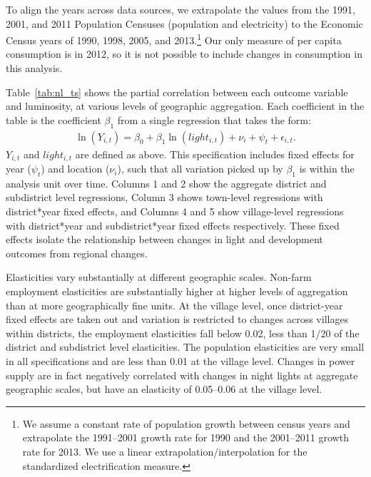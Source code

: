 \documentclass[12pt,letterpaper]{article}
\begin{document}
To align the years across data sources, we extrapolate the values from
the 1991, 2001, and 2011 Population Censuses (population and
electricity) to the Economic Census years of 1990, 1998, 2005, and
2013.\footnote{We assume a constant rate of population growth between
  census years and extrapolate the 1991--2001 growth rate for 1990 and
  the 2001--2011 growth rate for 2013. We use a linear
  extrapolation/interpolation for the standardized electrification
  measure.} Our only measure of per capita consumption is in 2012, so
it is not possible to include changes in consumption in this analysis.

Table~\ref{tab:nl_ts} shows the partial correlation between each
outcome variable and luminosity, at various levels of geographic
aggregation. Each coefficient in the table is the coefficient
$\beta_1$ from a single regression that takes the form:
%
\begin{align}
  \label{eq:nl_ts}
  \ln(Y_{i,t}) = \beta_0 + \beta_1 \ln(light_{i,t}) + \nu_i + \psi_t + \epsilon_{i,t}\text{.}
\end{align}
%
\noindent $Y_{i,t}$ and $light_{i,t}$ are defined as above. This
specification includes fixed effects for year ($\psi_t$) and location
($\nu_i$), such that all variation picked up by $\beta_1$ is within
the analysis unit over time. Columns 1 and 2 show the aggregate
district and subdistrict level regressions, Column 3 shows town-level
regressions with district*year fixed effects, and Columns 4 and 5 show
village-level regressions with district*year and subdistrict*year
fixed effects respectively. These fixed effects isolate the
relationship between changes in light and development outcomes from
regional changes.

Elasticities vary substantially at different geographic
scales. Non-farm employment elasticities are substantially higher at
higher levels of aggregation than at more geographically fine
units. At the village level, once district-year fixed effects are
taken out and variation is restricted to changes across villages
within districts, the employment elasticities fall below 0.02, less
than 1/20 of the district and subdistrict level elasticities. The
population elasticities are very small in all specifications and are
less than 0.01 at the village level. Changes in power supply are in
fact negatively correlated with changes in night lights at aggregate
geographic scales, but have an elasticity of 0.05--0.06 at the village
level.
\end{document}
